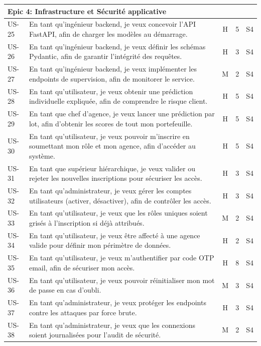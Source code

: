 \begin{footnotesize}
\begin{longtable}{|p{1.2cm}|p{8.5cm}|c|c|c|}
\multicolumn{5}{|l|}{Epic 4: Infrastructure et Sécurité applicative} \\
\hline
US-25 & En tant qu'ingénieur backend, je veux concevoir l'API FastAPI, afin de charger les modèles au démarrage. & H & 5 & S4 \\
\hline
US-26 & En tant qu'ingénieur backend, je veux définir les schémas Pydantic, afin de garantir l'intégrité des requêtes. & H & 3 & S4 \\
\hline
US-27 & En tant qu'ingénieur backend, je veux implémenter les endpoints de supervision, afin de monitorer le service. & M & 2 & S4 \\
\hline
US-28 & En tant qu'utilisateur, je veux obtenir une prédiction individuelle expliquée, afin de comprendre le risque client. & H & 5 & S4 \\
\hline
US-29 & En tant que chef d'agence, je veux lancer une prédiction par lot, afin d'obtenir les scores de tout mon portefeuille. & H & 5 & S4 \\
\hline
US-30 & En tant qu'utilisateur, je veux pouvoir m'inscrire en soumettant mon rôle et mon agence, afin d'accéder au système. & H & 5 & S4 \\
\hline
US-31 & En tant que supérieur hiérarchique, je veux valider ou rejeter les nouvelles inscriptions pour sécuriser les accès. & H & 3 & S4 \\
\hline
US-32 & En tant qu'administrateur, je veux gérer les comptes utilisateurs (activer, désactiver), afin de contrôler les accès. & H & 3 & S4 \\
\hline
US-33 & En tant qu'utilisateur, je veux que les rôles uniques soient grisés à l'inscription si déjà attribués. & M & 2 & S4 \\
\hline
US-34 & En tant qu'utilisateur, je veux être affecté à une agence valide pour définir mon périmètre de données. & H & 2 & S4 \\
\hline
US-35 & En tant qu'utilisateur, je veux m'authentifier par code OTP email, afin de sécuriser mon accès. & H & 8 & S4 \\
\hline
US-36 & En tant qu'utilisateur, je veux pouvoir réinitialiser mon mot de passe en cas d'oubli. & M & 3 & S4 \\
\hline
US-37 & En tant qu'administrateur, je veux protéger les endpoints contre les attaques par force brute. & H & 3 & S4 \\
\hline
US-38 & En tant qu'administrateur, je veux que les connexions soient journalisées pour l'audit de sécurité. & M & 2 & S4 \\
\hline


\end{longtable}
\end{footnotesize}
